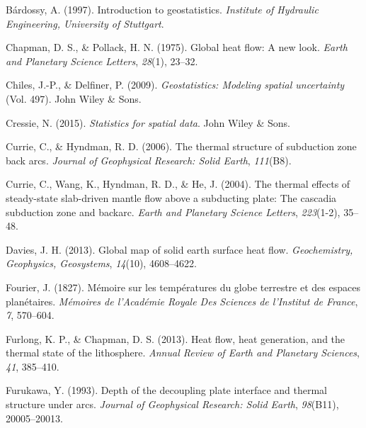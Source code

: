 \documentclass[draft,linenumbers]{agujournal2018}
\newlength{\cslhangindent}
\newenvironment{CSLReferences}[3] %
 {%
  \setlength{\parindent}{0pt}
  \ifodd #1 \everypar{\setlength{\hangindent}{\cslhangindent}}\ignorespaces\fi
  \ifnum #2 > 0
  \setlength{\parskip}{#2\baselineskip}
  \fi
 }%
 {}
\begin{document}
\hypertarget{refs}{}
\begin{CSLReferences}{1}{0}
\leavevmode{}%
Bárdossy, A. (1997). Introduction to geostatistics. \emph{Institute of
Hydraulic Engineering, University of Stuttgart}.

\leavevmode{}%
Chapman, D. S., \& Pollack, H. N. (1975). Global heat flow: A new look.
\emph{Earth and Planetary Science Letters}, \emph{28}(1), 23--32.

\leavevmode{}%
Chiles, J.-P., \& Delfiner, P. (2009). \emph{Geostatistics: Modeling
spatial uncertainty} (Vol. 497). John Wiley \& Sons.

\leavevmode{}%
Cressie, N. (2015). \emph{Statistics for spatial data}. John Wiley \&
Sons.

\leavevmode{}%
Currie, C., \& Hyndman, R. D. (2006). The thermal structure of
subduction zone back arcs. \emph{Journal of Geophysical Research: Solid
Earth}, \emph{111}(B8).

\leavevmode{}%
Currie, C., Wang, K., Hyndman, R. D., \& He, J. (2004). The thermal
effects of steady-state slab-driven mantle flow above a subducting
plate: The cascadia subduction zone and backarc. \emph{Earth and
Planetary Science Letters}, \emph{223}(1-2), 35--48.

\leavevmode{}%
Davies, J. H. (2013). Global map of solid earth surface heat flow.
\emph{Geochemistry, Geophysics, Geosystems}, \emph{14}(10), 4608--4622.

\leavevmode{}%
Fourier, J. (1827). M{é}moire sur les temp{é}ratures du globe terrestre
et des espaces plan{é}taires. \emph{M{é}moires de l'Acad{é}mie Royale
Des Sciences de l'Institut de France}, \emph{7}, 570--604.

\leavevmode{}%
Furlong, K. P., \& Chapman, D. S. (2013). Heat flow, heat generation,
and the thermal state of the lithosphere. \emph{Annual Review of Earth
and Planetary Sciences}, \emph{41}, 385--410.

\leavevmode{}%
Furukawa, Y. (1993). Depth of the decoupling plate interface and thermal
structure under arcs. \emph{Journal of Geophysical Research: Solid
Earth}, \emph{98}(B11), 20005--20013.


\end{CSLReferences}
\end{document}
